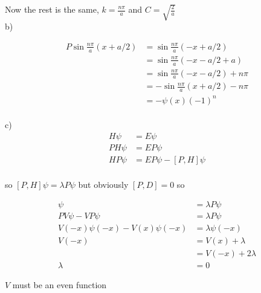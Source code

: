\documentclass{article}
\newcommand{\<}{\langle}
\renewcommand{\>}{\rangle}
\begin{document}
Now the rest is the same, $k = \frac{n\pi}{a}$ and $C = \sqrt{\frac{2}{a}}$
\\
b) 

\begin{align*}
P\sin \frac{n\pi}{a} (x+a/2) &= \sin \frac{n\pi}{a}(-x + a/2) \\
&= \sin \frac{n\pi}{a} (-x-a/2 + a) \\
&= \sin \frac{n\pi}{a} (-x-a/2) + n\pi \\
&= -\sin \frac{n\pi}{a} (x+a/2) - n\pi \\
&= -\psi(x) (-1)^n
\end{align*}
\\
c)
\begin{align*}
H\psi &= E\psi \\
PH\psi &= EP\psi \\
HP\psi &= EP\psi - [P,H]\psi \\
\end{align*}

so $[P,H]\psi = \lambda P\psi$
but obviously $[P,D] = 0$ so

\begin{align*}
[P,V]\psi &= \lambda P\psi \\
PV\psi - VP\psi &= \lambda P\psi \\
V(-x)\psi(-x) - V(x)\psi(-x) &= \lambda \psi(-x) \\
V(-x) &= V(x) + \lambda \\
&= V(-x) + 2\lambda \\
\lambda &= 0
\end{align*}

$V$ must be an even function
\end{document}
